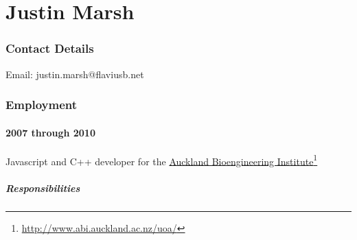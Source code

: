 \documentclass[10pt,oneside]{memoir}
\title{\mytitle}
\author{\myauthor}
\def\mychapterstyle{article}
\def\mypagestyle{headings}
\begin{document}
\chapterstyle{\mychapterstyle}
\pagestyle{\mypagestyle}

%
%

\frontmatter




%
%


\setlength{\parindent}{1em}

\mainmatter
\part{Justin Marsh}
\label{justinmarsh}

{}
\section*{Contact Details}
\label{contactdetails}

Email: justin.marsh@flaviusb.net



{}
\section*{Employment}
\label{employment}

\subsection*{2007 through 2010}
\label{through2010}

Javascript and C++ developer for the \href{http://www.abi.auckland.ac.nz/uoa/}{Auckland Bioengineering Institute}\footnote{\href{http://www.abi.auckland.ac.nz/uoa/}{http://www.abi.auckland.ac.nz/uoa/}}


\subsubsection*{Responsibilities}
\label{responsibilities}
\end{document}
